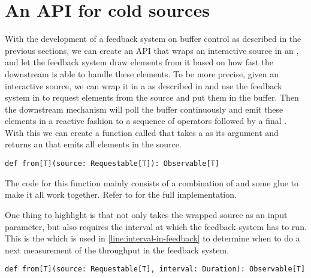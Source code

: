 \section{An API for cold sources}
With the development of a feedback system on buffer control as described in the previous sections, we can create an API that wraps an interactive source in an \obs, and let the feedback system draw elements from it based on how fast the downstream is able to handle these elements. To be more precise, given an interactive source, we can wrap it in a  as described in  and use the feedback system in  to request elements from the source and put them in the buffer. Then the downstream mechanism will poll the buffer continuously and emit these elements in a reactive fashion to a sequence of operators followed by a final \obv. With this we can create a function called  that takes a  as its argument and returns an  that emits all elements in the source.

\begin{minipage}{\linewidth}
\begin{lstlisting}[style=InlineScalaStyle]
def from[T](source: Requestable[T]): Observable[T]
\end{lstlisting}
\end{minipage}

The code for this function mainly consists of a combination of  and some glue to make it all work together. Refer to  for the full implementation.

One thing to highlight is that  not only takes the wrapped source as an input parameter, but also requires the interval at which the feedback system has to run. This is the  which is used in  \cref{line:interval-in-feedback} to determine when to do a next measurement of the throughput in the feedback system.

\begin{minipage}{\linewidth}
\begin{lstlisting}[style=InlineScalaStyle]
def from[T](source: Requestable[T], interval: Duration): Observable[T]
\end{lstlisting}
\end{minipage}

